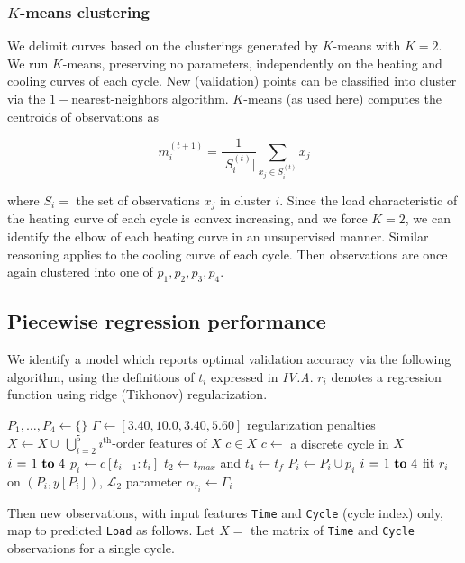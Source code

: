 \documentclass[letterpaper, 10 pt, conference]{ieeeconf}  %
\begin{document}
\subsubsection{$K$-means clustering}
We delimit curves based on the clusterings generated by $K$-means with $K=2$.  We run $K$-means, preserving no parameters, independently on the heating and cooling curves of each cycle. New (validation) points can be classified into cluster via the $1-$nearest-neighbors algorithm. $K$-means (as used here) computes the centroids of observations as

$$
m_i^{(t+1)} = \frac{1}{\vert S_i^{(t)} \vert} \sum_{x_j \in S_i^{(t)}} x_j
$$

where $S_i =$ the set of observations $x_j$ in cluster $i$. Since the load characteristic of the heating curve of each cycle is convex increasing, and we force $K=2$, we can identify the elbow of each heating curve in an unsupervised manner. Similar reasoning applies to the cooling curve of each cycle. Then observations are once again clustered into one of $p_1, p_2, p_3, p_4$.

\subsection{Piecewise regression performance}
We identify a model which reports optimal validation accuracy via the following algorithm, using the definitions of $t_i$ expressed in \textit{IV.A}. $r_i$ denotes a regression function using ridge (Tikhonov) regularization.
\begin{codebox}
  \li $P_1, \dots , P_4 \gets \{\}$
  \li $\Gamma \gets [3.40, 10.0, 3.40, 5.60]$ \hspace{3pt} \Comment regularization penalties
  \li $X \gets X \cup \, \bigcup_{i=2}^5 i^{\text{th}}\text{-order features of }X$
  \li \For $c \in X$ \hspace{60pt} \Comment $c \gets $ a discrete cycle in $X$ \Do
    \li \For $i \gets 1 \To 4$ \Do
      \li $p_i \gets c[t_{i-1}:t_i]$ \Comment $t_2 \gets t_{max}$ and $t_4 \gets t_f$
      \li $P_i \gets P_i \cup p_i$
    \End
  \End
  \li \For $i \gets 1 \To 4$ \Do
    \li fit $r_i$ on $(P_i, y[P_i])$, $\mathcal{L}_2$ parameter $\alpha_{r_i} \gets \Gamma_i$
  \End
\end{codebox}

Then new observations, with input features \verb|Time| and \verb|Cycle| (cycle index) only, map to predicted \verb|Load| as follows. Let $X=$ the matrix of \verb|Time| and \verb|Cycle| observations for a single cycle.
\end{document}
